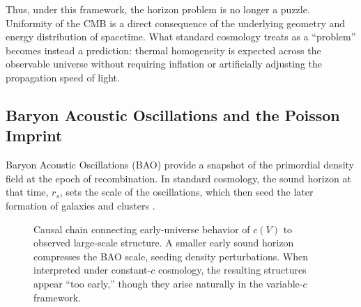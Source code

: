 \documentclass[12pt]{article}
\begin{document}
Thus, under this framework, the horizon problem is no longer a puzzle. Uniformity of the CMB is a direct consequence of the underlying geometry and energy distribution of spacetime. What standard cosmology treats as a “problem” becomes instead a prediction: thermal homogeneity is expected across the observable universe without requiring inflation or artificially adjusting the propagation speed of light.

\subsection{Baryon Acoustic Oscillations and the Poisson Imprint}

Baryon Acoustic Oscillations (BAO) provide a snapshot of the primordial density field at the epoch of recombination. In standard cosmology, the sound horizon at that time, $r_s$, sets the scale of the oscillations, which then seed the later formation of galaxies and clusters \cite{eisenstein2005,white2005}.  

\begin{figure}[h!]
\centering
{}
\caption{Causal chain connecting early-universe behavior of $c(V)$ to observed large-scale structure. 
A smaller early sound horizon compresses the BAO scale, seeding density perturbations. 
When interpreted under constant-$c$ cosmology, the resulting structures appear ``too early,'' though they arise naturally in the variable-$c$ framework.}
\label{fig:BAO_flow}
\end{figure}
\end{document}
